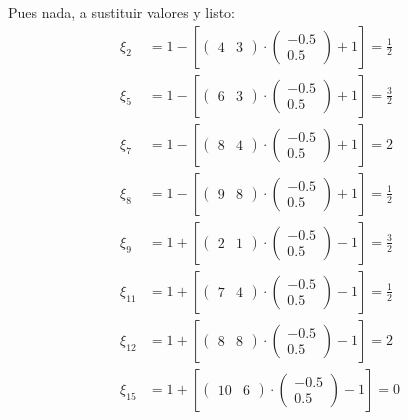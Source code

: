 \begin{example}
\noindent Pues nada, a sustituir valores y listo:
\begin{align*}
\xi_2 &= 1 - \left[\begin{pmatrix} 4 & 3 \end{pmatrix} \cdot \begin{pmatrix} -0.5 \\ 0.5 \end{pmatrix} + 1\right] = \frac{1}{2} \\
\xi_5 &= 1 - \left[\begin{pmatrix} 6 & 3 \end{pmatrix} \cdot \begin{pmatrix} -0.5 \\ 0.5 \end{pmatrix} + 1\right] = \frac{3}{2} \\
\xi_7 &= 1 - \left[\begin{pmatrix} 8 & 4 \end{pmatrix} \cdot \begin{pmatrix} -0.5 \\ 0.5 \end{pmatrix} + 1\right] = 2 \\
\xi_8 &= 1 - \left[\begin{pmatrix} 9 & 8 \end{pmatrix} \cdot \begin{pmatrix} -0.5 \\ 0.5 \end{pmatrix} + 1\right] = \frac{1}{2} \\
\xi_9 &= 1 + \left[\begin{pmatrix} 2 & 1 \end{pmatrix} \cdot \begin{pmatrix} -0.5 \\ 0.5 \end{pmatrix} - 1\right] = \frac{3}{2} \\
\xi_{11} &= 1 + \left[\begin{pmatrix} 7 & 4 \end{pmatrix} \cdot \begin{pmatrix} -0.5 \\ 0.5 \end{pmatrix} - 1\right] = \frac{1}{2} \\
\xi_{12} &= 1 + \left[\begin{pmatrix} 8 & 8 \end{pmatrix} \cdot \begin{pmatrix} -0.5 \\ 0.5 \end{pmatrix} - 1\right] = 2 \\
\xi_{15} &= 1 + \left[\begin{pmatrix} 10 & 6 \end{pmatrix} \cdot \begin{pmatrix} -0.5 \\ 0.5 \end{pmatrix} - 1\right] = 0
\end{align*}


\end{example}
